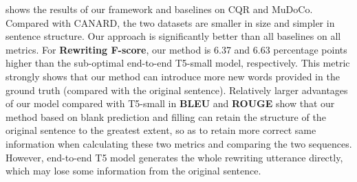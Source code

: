  shows 
the results of our framework and baselines on CQR and MuDoCo. Compared with CANARD, the two datasets are smaller in size and simpler in sentence structure. Our approach is significantly better than all baselines on all metrics. For \textbf{Rewriting F-score}, our method is 6.37 and 6.63 percentage points higher than the sub-optimal end-to-end T5-small model, respectively. This metric strongly shows that our method can introduce more new words provided in the ground truth (compared with the original sentence). Relatively larger advantages of our model compared with T5-small in \textbf{BLEU} and \textbf{ROUGE} show that 
our method based on blank prediction and filling can retain the structure of the original sentence to the greatest extent, so as to retain more correct same information when calculating these two metrics and comparing the two sequences.
However, end-to-end T5 model generates the whole rewriting utterance directly, which may lose some information from the original sentence.

